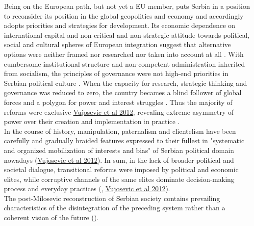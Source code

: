 \documentclass[11pt]{report}
\begin{document}
Being on the European path, but not yet a EU member, puts Serbia in a position to reconsider its position in the global geopolitics and economy and accordingly adopts priorities and strategies for development.
Its economic dependence on international capital and non-critical and non-strategic attitude towards political, social and cultural spheres of European integration suggest that alternative options were neither framed nor researched nor taken into account at all \href{}{\citealt{Vujosevic et al 2012}}.
With cumbersome institutional structure and non-competent administration inherited from socialism, the principles of governance were not high-end priorities in Serbian political culture \href{}{\citealt{trkulja_serbian_2012}}.
When the capacity for research, strategic thinking and governance was reduced to zero, the country becames a blind follower of global forces and a polygon for power and interest struggles \href{}{\citealt{vujosevic_conundrum_2012}}.
Thus the majority of reforms were exclusive \href{}{Vujosevic et al 2012}, revealing extreme asymmetry of power over their creation and implementation in practice \href{}{\citealt{vujosevic_regionalizam_2015}}.
\\
In the course of history, manipulation, paternalism and clientelism have been carefully and gradually braided features expressed to their fullest in  "systematic and organized mobilization of interests and bias" of Serbian political domain nowadays (\href{}{Vujosevic et al 2012}).
In sum, in the lack of broader political and societal dialogue, transitional reforms were imposed by political and economic elites, while corruptive channels of the same elites dominate decision-making process and everyday practices (\href{}{\citealt{vujosevic_conundrum_2012}}, \href{}{Vujosevic et al 2012}).%
\\

The post-Milosevic reconstruction of Serbian society contains prevailing characteristics of the disintegration of the preceding system rather than a coherent vision of the future (\href{}{\citealt{stanilov_post-socialist_2007}}). 
\\
\end{document}

